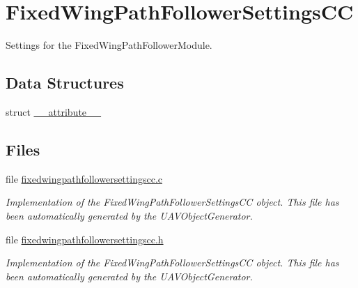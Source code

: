 \hypertarget{group___fixed_wing_path_follower_settings_c_c}{\section{\-Fixed\-Wing\-Path\-Follower\-Settings\-C\-C}
\label{group___fixed_wing_path_follower_settings_c_c}
}


\-Settings for the \-Fixed\-Wing\-Path\-Follower\-Module.  


\subsection*{\-Data \-Structures}
\begin{DoxyCompactItemize}
\item 
struct \hyperlink{struct____attribute____}{\-\_\-\-\_\-attribute\-\_\-\-\_\-}
\end{DoxyCompactItemize}
\subsection*{\-Files}
\begin{DoxyCompactItemize}
\item 
file \hyperlink{fixedwingpathfollowersettingscc_8c}{fixedwingpathfollowersettingscc.\-c}
\begin{DoxyCompactList}\small\item\em \-Implementation of the \-Fixed\-Wing\-Path\-Follower\-Settings\-C\-C object. \-This file has been automatically generated by the \-U\-A\-V\-Object\-Generator. \end{DoxyCompactList}\item 
file \hyperlink{fixedwingpathfollowersettingscc_8h}{fixedwingpathfollowersettingscc.\-h}
\begin{DoxyCompactList}\small\item\em \-Implementation of the \-Fixed\-Wing\-Path\-Follower\-Settings\-C\-C object. \-This file has been automatically generated by the \-U\-A\-V\-Object\-Generator. \end{DoxyCompactList}\end{DoxyCompactItemize}
